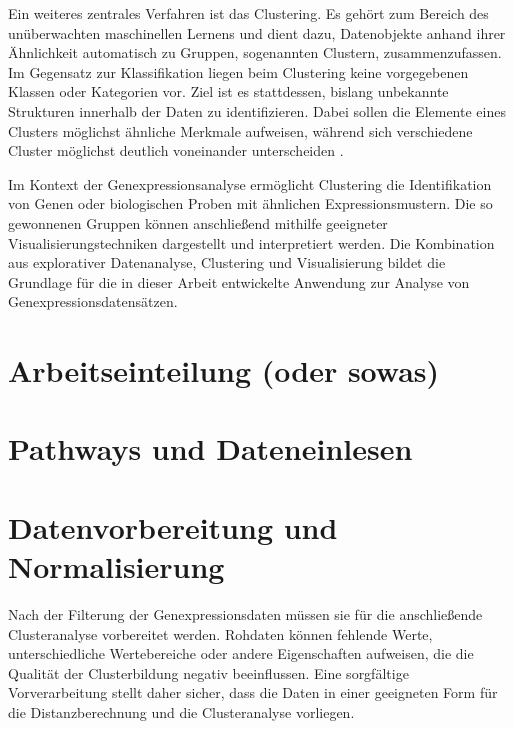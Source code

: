 \documentclass[12pt]{article}
\begin{document}
Ein weiteres zentrales Verfahren ist das Clustering. Es gehört zum Bereich des unüberwachten maschinellen Lernens und dient dazu, Datenobjekte anhand ihrer Ähnlichkeit automatisch zu Gruppen, sogenannten Clustern, zusammenzufassen. Im Gegensatz zur Klassifikation liegen beim Clustering keine vorgegebenen Klassen oder Kategorien vor. Ziel ist es stattdessen, bislang unbekannte Strukturen innerhalb der Daten zu identifizieren. Dabei sollen die Elemente eines Clusters möglichst ähnliche Merkmale aufweisen, während sich verschiedene Cluster möglichst deutlich voneinander unterscheiden \cite{Rokach2005}.

Im Kontext der Genexpressionsanalyse ermöglicht Clustering die Identifikation von Genen oder biologischen Proben mit ähnlichen Expressionsmustern. Die so gewonnenen Gruppen können anschließend mithilfe geeigneter Visualisierungstechniken dargestellt und interpretiert werden. Die Kombination aus explorativer Datenanalyse, Clustering und Visualisierung bildet die Grundlage für die in dieser Arbeit entwickelte Anwendung zur Analyse von Genexpressionsdatensätzen.


\section{Arbeitseinteilung (oder sowas)}
\label{arbeitseinteilung}

\newpage
\pagestyle{fancy}
\fancyhead{}
\section{Pathways und Dateneinlesen}
\label{pathways}

\newpage
\pagestyle{fancy}
\fancyhead{}

\section{Datenvorbereitung und Normalisierung}
\label{datenvorbereitung und normalisierung}

Nach der Filterung der Genexpressionsdaten müssen sie für die anschließende Clusteranalyse vorbereitet werden. Rohdaten können fehlende Werte, unterschiedliche Wertebereiche oder andere Eigenschaften aufweisen, die die Qualität der Clusterbildung negativ beeinflussen. Eine sorgfältige Vorverarbeitung stellt daher sicher, dass die Daten in einer geeigneten Form für die Distanzberechnung und die Clusteranalyse vorliegen.
\end{document}

